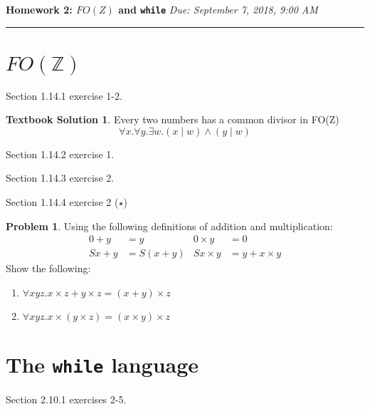 \documentclass[10pt]{article}
\theoremstyle{definition}
\newtheorem{prob}{Problem}
\newtheorem{ts}{Textbook Solution}
\begin{document}
\noindent
\textbf{Homework 2: $FO(Z)$ and \texttt{while}} \hfill \emph{Due: September 7, 2018, 9:00 AM}
\hrule

\vspace{.3in}

\section*{$FO(\mathbb Z)$}

Section 1.14.1 exercise 1-2.

\begin{ts}
 Every two numbers has a common divisor in FO(Z)
 \begin{equation}
 	\forall x. \forall y. \exists w. ( x \mid w) \wedge (y \mid w)
 \end{equation}
\end{ts}

Section 1.14.2 exercise 1.

Section 1.14.3 exercise 2.

Section 1.14.4 exercise 2 ($\star$)

\begin{prob}
  Using the following definitions of addition and multiplication:
  \begin{align*}
    0 + y &= y & 0 \times y &= 0 \\
    Sx + y &= S(x + y) & Sx \times y &= y + x \times y
  \end{align*}
  Show the following:
  \begin{enumerate}[label=(\alph*)]
  \item $\forall x y z. x \times z + y \times z = (x + y) \times z$
  \item $\forall x y z. x \times (y \times z) = (x \times y) \times z$
  \end{enumerate}
\end{prob}

\section*{The \texttt{while} language}

Section 2.10.1 exercises 2-5.
\end{document}
